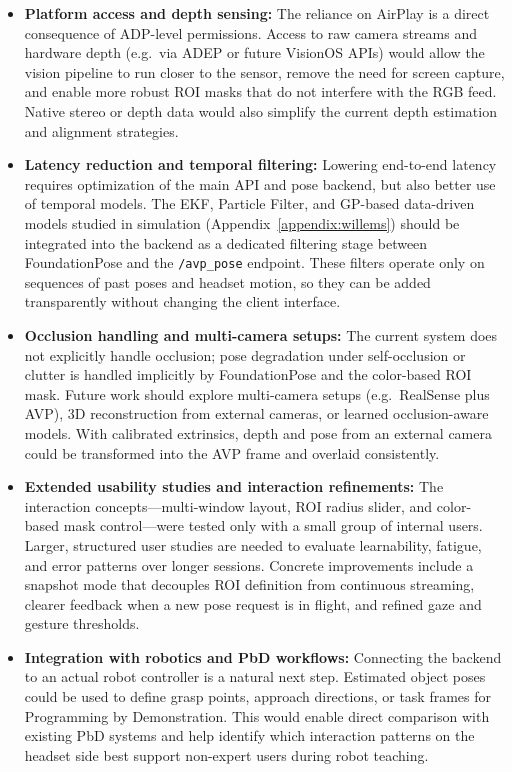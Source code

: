 \begin{itemize}
    \item \textbf{Platform access and depth sensing:}  
    The reliance on AirPlay is a direct consequence of ADP-level permissions. Access to raw camera streams and hardware depth (e.g.\ via ADEP or future VisionOS APIs) would allow the vision pipeline to run closer to the sensor, remove the need for screen capture, and enable more robust ROI masks that do not interfere with the RGB feed. Native stereo or depth data would also simplify the current depth estimation and alignment strategies.

    \item \textbf{Latency reduction and temporal filtering:}  
    Lowering end-to-end latency requires optimization of the main API and pose backend, but also better use of temporal models. The EKF, Particle Filter, and GP-based data-driven models studied in simulation (Appendix~\ref{appendix:willems}) should be integrated into the backend as a dedicated filtering stage between FoundationPose and the \texttt{/avp\_pose} endpoint. These filters operate only on sequences of past poses and headset motion, so they can be added transparently without changing the client interface.

    \item \textbf{Occlusion handling and multi-camera setups:}  
    The current system does not explicitly handle occlusion; pose degradation under self-occlusion or clutter is handled implicitly by FoundationPose and the color-based ROI mask. Future work should explore multi-camera setups (e.g.\ RealSense plus AVP), 3D reconstruction from external cameras, or learned occlusion-aware models. With calibrated extrinsics, depth and pose from an external camera could be transformed into the AVP frame and overlaid consistently.

    \item \textbf{Extended usability studies and interaction refinements:}  
    The interaction concepts—multi-window layout, ROI radius slider, and color-based mask control—were tested only with a small group of internal users. Larger, structured user studies are needed to evaluate learnability, fatigue, and error patterns over longer sessions. Concrete improvements include a snapshot mode that decouples ROI definition from continuous streaming, clearer feedback when a new pose request is in flight, and refined gaze and gesture thresholds.

    \item \textbf{Integration with robotics and PbD workflows:}  
    Connecting the backend to an actual robot controller is a natural next step. Estimated object poses could be used to define grasp points, approach directions, or task frames for Programming by Demonstration. This would enable direct comparison with existing PbD systems and help identify which interaction patterns on the headset side best support non-expert users during robot teaching.


\end{itemize}
